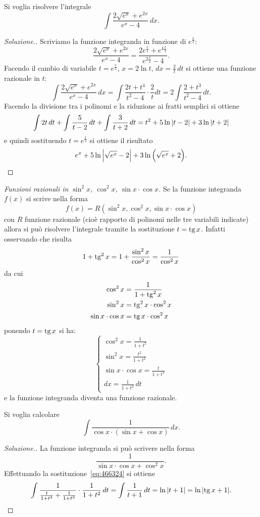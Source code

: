 \begin{example}
Si voglia risolvere l'integrale
\[
  \int \frac{2\sqrt{e^x} + e^{2x}}{e^x-4}\, dx.
\]
\end{example}
\begin{proof}[Soluzione.]
Scriviamo la funzione integranda in funzione di $e^{\frac x 2}$:
\[
  \frac{2\sqrt{e^x} + e^{2x}}{e^x-4}
  =\frac{2e^{\frac x 2}+e^{4\frac x 2}}{e^{2\frac x 2}-4}.
\]
Facendo il cambio di variabile $t=e^{\frac x 2}$, $x=2\ln t$, $dx=\frac 2 t\, dt$
si ottiene una funzione razionale in $t$:
\[
  \int \frac{2\sqrt{e^x} + e^{2x}}{e^x-4}\, dx
  = \int \frac{2t + t^4}{t^2-4}\cdot \frac 2 t dt
  = 2\int \frac{2+t^3}{t^2-4}\, dt.
\]
Facendo la divisione tra i polinomi e la riduzione ai fratti semplici si ottiene
\[
 \int 2t\, dt + \int \frac{5}{t-2}\, dt + \int \frac{3}{t+2}\, dt
 = t^2 + 5\ln{\left|t-2\right|} + 3\ln{\left|t+2\right|}
\]
e quindi sostituendo $t=e^{\frac x 2}$ si ottiene il risultato
\[
 e^x + 5 \ln {\left|\sqrt{e^x}-2\right|} + 3 \ln{\left( \sqrt{e^x}+2 \right)}.
\]
\end{proof}

\emph{Funzioni razionali in $\sin^2 x$, $\cos^2 x$, $\sin x \cdot \cos x$.}
Se la funzione integranda $f(x)$ si scrive nella forma
\[
  f(x) = R(\sin^2 x, \cos^2 x, \sin x \cdot \cos x)
\]
con $R$ funzione razionale (cioè rapporto di polinomi nelle tre variabili indicate)
 allora si può risolvere l'integrale
tramite la sostituzione $t=\operatorname{tg} x$. Infatti
osservando che risulta
\[
  1 + \operatorname{tg}^2 x = 1 + \frac{\sin^2 x}{\cos^2 x} = \frac{1}{\cos^2 x}
\]
da cui
\begin{align*}
\cos^2 x &= \frac{1}{1+\operatorname{tg}^2 x}\\
\sin^2 x &= \operatorname{tg}^2 x \cdot\cos^2 x\\
\sin x \cdot \cos x &= \operatorname{tg} x \cdot \cos^2 x
\end{align*}
ponendo $t = \operatorname{tg} x$ si ha:
\begin{equation}\label{eq:466324}
\begin{cases}
  \cos^2 x = \frac{1}{1+t^2}\\
  \sin^2 x = \frac{t^2}{1+t^2}\\
  \sin x \cdot \cos x = \frac{t}{1+t^2}\\
  dx = \frac{1}{1+t^2}\, dt
\end{cases}
\end{equation}
e la funzione integranda diventa una funzione razionale.

\begin{example}
\label{ex:35663}
Si voglia calcolare
\[
  \int \frac{1}{\cos x \cdot ( \sin x + \cos x)}\, dx.
\]
\end{example}
\begin{proof}[Soluzione.]
La funzione integranda si può scrivere nella forma
\[
  \frac{1}{\sin x \cdot \cos x + \cos^2x}.
\]
Effettuando la sostituzione~\eqref{eq:466324}
si ottiene
\[
  \int \frac{1}{\frac t {1+t^2} + \frac{1}{1+t^2}}\cdot \frac{1}{1+t^2}\, dt
  = \int \frac{1}{t+1}\, dt = \ln {\left|t+1\right|} = \ln {\left|\operatorname{tg}x + 1\right|}.
\]
\end{proof}

